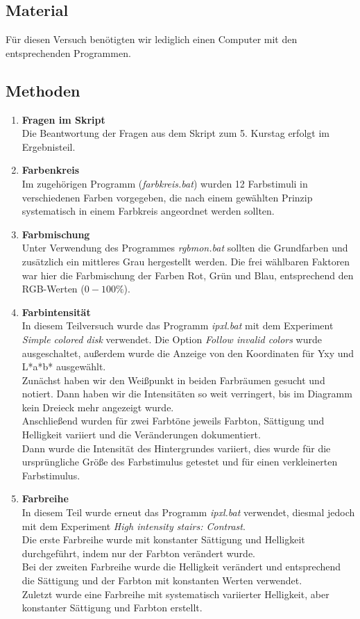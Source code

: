 \documentclass[11pt]{article}
\newcommand{\RM}[1]{\MakeUppercase{\romannumeral #1{}}}
\begin{document}
\subsection{Material}
Für diesen Versuch benötigten wir lediglich einen Computer mit den entsprechenden Programmen.
\subsection{Methoden}
\begin{enumerate}
\item \textbf{Fragen im Skript} \\
Die Beantwortung der Fragen aus dem Skript zum 5. Kurstag erfolgt im Ergebnisteil.
\item \textbf{Farbenkreis} \\
Im zugehörigen Programm (\textit{farbkreis.bat}) wurden 12 Farbstimuli in verschiedenen Farben vorgegeben, die nach einem gewählten Prinzip systematisch in einem Farbkreis angeordnet werden sollten. 
\item \textbf{Farbmischung \RM{1}} \\
Unter Verwendung des Programmes \textit{rgbmon.bat} sollten die Grundfarben und zusätzlich ein mittleres Grau hergestellt werden. Die frei wählbaren Faktoren war hier die Farbmischung der Farben Rot, Grün und Blau, entsprechend den RGB-Werten ($0-100\%$). 
\item \textbf{Farbintensität} \\
In diesem Teilversuch wurde das Programm \textit{ipxl.bat} mit dem Experiment \textit{Simple colored disk} verwendet. Die Option \textit{Follow invalid colors} wurde ausgeschaltet, außerdem wurde die Anzeige von den Koordinaten für Yxy und L*a*b* ausgewählt. \\
Zunächst haben wir den Weißpunkt in beiden Farbräumen gesucht und notiert. Dann haben wir die Intensitäten so weit verringert, bis im Diagramm kein Dreieck mehr angezeigt wurde. \\
Anschließend wurden für zwei Farbtöne jeweils Farbton, Sättigung und Helligkeit variiert und die Veränderungen dokumentiert. \\
Dann wurde die Intensität des Hintergrundes variiert, dies wurde für die ursprüngliche Größe des Farbstimulus getestet und für einen verkleinerten Farbstimulus.
\item \textbf{Farbreihe} \\
In diesem Teil wurde erneut das Programm \textit{ipxl.bat} verwendet, diesmal jedoch mit dem Experiment \textit{High intensity stairs: Contrast}. \\
Die erste Farbreihe wurde mit konstanter Sättigung und Helligkeit durchgeführt, indem nur der Farbton verändert wurde. \\
Bei der zweiten Farbreihe wurde die Helligkeit verändert und entsprechend die Sättigung und der Farbton mit konstanten Werten verwendet. \\
Zuletzt wurde eine Farbreihe mit systematisch variierter Helligkeit, aber konstanter Sättigung und Farbton erstellt.


\end{enumerate}
\end{document}
